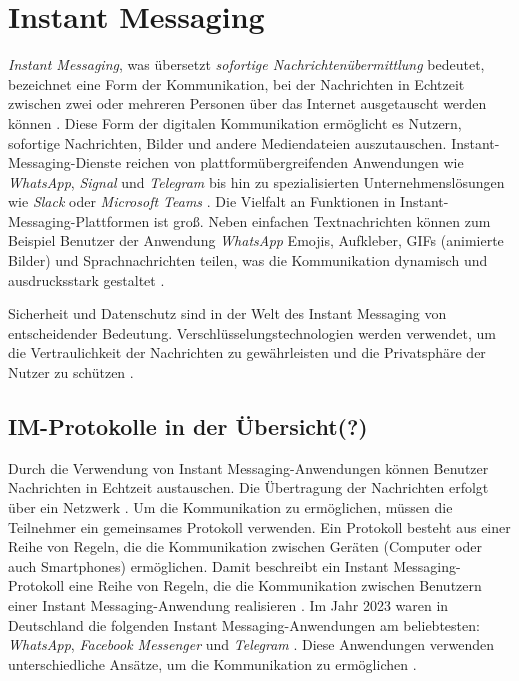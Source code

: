 \section{Instant Messaging}
\label{sec:instant_messaging_basics}

\textit{Instant Messaging}, was übersetzt \textit{sofortige Nachrichtenübermittlung} bedeutet, bezeichnet eine Form der Kommunikation, bei der Nachrichten in Echtzeit zwischen zwei oder mehreren Personen über das Internet ausgetauscht werden können \Parencite[S. 69]{nist_mobileDeviceForensics}. Diese Form der digitalen Kommunikation ermöglicht es Nutzern, sofortige Nachrichten, Bilder und andere Mediendateien auszutauschen. Instant-Messaging-Dienste reichen von plattformübergreifenden Anwendungen wie \textit{WhatsApp}, \textit{Signal} und \textit{Telegram} bis hin zu spezialisierten Unternehmenslösungen wie \textit{Slack} oder \textit{Microsoft Teams} \parencite{Plett_IMDefinition}. Die Vielfalt an Funktionen in Instant-Messaging-Plattformen ist groß. Neben einfachen Textnachrichten können zum Beispiel Benutzer der Anwendung \textit{WhatsApp} Emojis, Aufkleber, GIFs (animierte Bilder) und Sprachnachrichten teilen, was die Kommunikation dynamisch und ausdrucksstark gestaltet \Parencite{whatsapp_funktionen}.

Sicherheit und Datenschutz sind in der Welt des Instant Messaging von entscheidender Bedeutung. Verschlüsselungstechnologien werden verwendet, um die Vertraulichkeit der Nachrichten zu gewährleisten und die Privatsphäre der Nutzer zu schützen \parencite[S. 13706]{Wang_IMSecurity}.


\subsection{IM-Protokolle in der Übersicht(?)}

Durch die Verwendung von Instant Messaging-Anwendungen können Benutzer Nachrichten in Echtzeit austauschen. Die Übertragung der Nachrichten erfolgt über ein Netzwerk \Parencite[S. 69]{nist_mobileDeviceForensics}. Um die Kommunikation zu ermöglichen, müssen die Teilnehmer ein gemeinsames Protokoll verwenden. Ein Protokoll besteht aus einer Reihe von Regeln, die die Kommunikation zwischen Geräten (Computer oder auch Smartphones) ermöglichen. Damit beschreibt ein Instant Messaging-Protokoll eine Reihe von Regeln, die die Kommunikation zwischen Benutzern einer Instant Messaging-Anwendung realisieren \Parencite{Novalnet_Protokoll}. Im Jahr 2023 waren in Deutschland die folgenden Instant Messaging-Anwendungen am beliebtesten: \textit{WhatsApp}, \textit{Facebook Messenger} und \textit{Telegram} \parencite{Statista_MessengerNutzung}. Diese Anwendungen verwenden unterschiedliche Ansätze, um die Kommunikation zu ermöglichen \parencite[S. 103]{Luntovskyy_ModRechnernetze}. 


